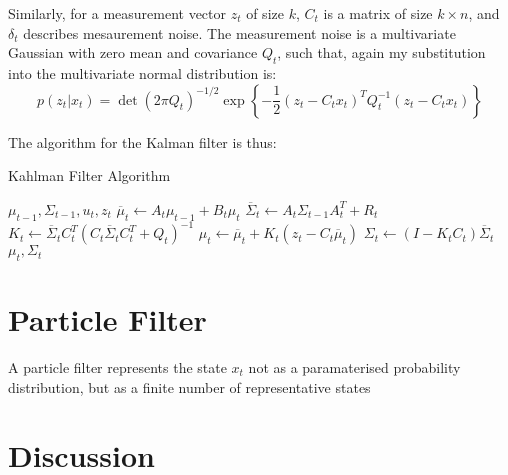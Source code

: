 \documentclass[english]{article}
\begin{document}
Similarly, for a measurement vector $z_t$ of size $k$, $C_t$ is a matrix of size $k \times n$, and $\delta_t$ describes mesaurement noise. The measurement noise is a multivariate Gaussian with zero mean and covariance $Q_t$, such that, again my substitution into the multivariate normal distribution is:
\begin{equation}
	p(z_t | x_t) = \det(2 \pi Q_t)^{-1/2} \exp\left\{-\frac{1}{2}(z_t - C_t x_t)^T Q_t^{-1}(z_t - C_t x_t)\right\}
\end{equation}

The algorithm for the Kalman filter is thus:

\begin{algorithm}
\caption{Kahlman Filter Algorithm}
\label{alg:kalman}
\begin{algorithmic}
	\REQUIRE $\mu_{t-1}, \Sigma_{t-1}, u_t, z_t$
	\STATE $\overline{\mu}_t \leftarrow A_t\mu_{t-1} + B_t \mu_t$
	\STATE $\overline{\Sigma}_t \leftarrow A_t \Sigma_{t-1}A_t^T + R_t$
	\STATE
	\STATE $K_t \leftarrow \overline{\Sigma}_t C_t^T\left(C_t \overline{\Sigma}_t C_t^T + Q_t\right)^{-1}$
	\STATE $\mu_t \leftarrow \overline{\mu}_t + K_t\left(z_t - C_t \overline{\mu}_t\right)$
	\STATE $\Sigma_t \leftarrow (I-K_t C_t)\overline{\Sigma}_t$
	\RETURN $\mu_t, \Sigma_t$
\end{algorithmic}
\end{algorithm}

\section*{Particle Filter}

A particle filter represents the state $x_t$ not as a paramaterised probability distribution, but as a finite number of representative states



\section*{Discussion}



\end{document}
